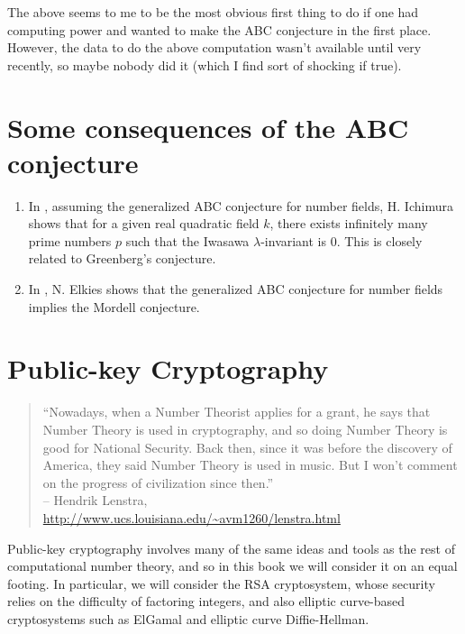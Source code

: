 \documentclass{book}
\begin{document}
The above seems to me to be the most obvious first thing to
do if one had computing power and wanted to make the ABC
conjecture in the first place.  However, the data to do the
above computation wasn't available until very recently,
so maybe nobody did it (which I find sort of shocking if true).

\section{Some consequences of the ABC conjecture}

\begin{enumerate}
\item In \cite{ichimura1998note}, assuming the generalized ABC conjecture for number fields, H. Ichimura shows that for a given real quadratic field $k$, there exists infinitely many prime numbers $p$ such that the Iwasawa $\lambda$-invariant is 0.
This is closely related to Greenberg's conjecture.
\item In \cite{elkies1991abc}, N. Elkies shows that the generalized ABC conjecture for number fields implies the Mordell conjecture.
\end{enumerate}


\section{Public-key Cryptography}


\begin{quote}
``Nowadays, when a Number Theorist applies for a grant, he says
that Number Theory is used in cryptography, and so doing Number
Theory is good for National Security. Back then, since it was
before the discovery of America, they said Number Theory is
used in music. But I won't comment on the progress of
civilization since then.''\\-- Hendrik Lenstra,\\ \url{http://www.ucs.louisiana.edu/~avm1260/lenstra.html}
\end{quote}


Public-key cryptography involves many of the same ideas and tools
as the rest of computational number theory, and so in this book
we will consider it on an equal footing.
In particular, we will consider the RSA cryptosystem, whose
security relies on the difficulty of factoring integers,
and also elliptic curve-based cryptosystems
such as ElGamal and elliptic curve Diffie-Hellman.
\end{document}
